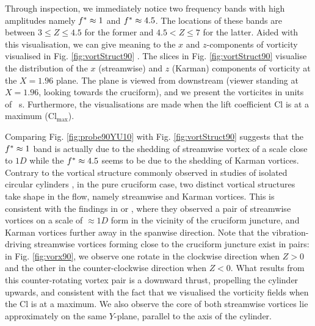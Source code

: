 \documentclass[oneside]{utmthesis}
\begin{document}
Through inspection, we immediately notice two frequency bands with high amplitudes namely $f^{*} \approx 1$ and $f^{*} \approx 4.5$. The locations of these bands are between $3 \leq Z \leq 4.5$ for the former and $4.5 < Z \leq 7$ for the latter. Aided with this visualisation, we can give meaning to the $x$ and $z$-components of vorticity visualised in Fig. \ref{fig:vortStruct90} . The slices in Fig. \ref{fig:vortStruct90} visualise the distribution of the $x$ (streamwise) and $z$ (Karman) components of vorticity at the $X = 1.96$ plane. The plane is viewed from downstream (viewer standing at $X = 1.96$, looking towards the cruciform), and we present the vorticites in units of \si{\per\second}. Furthermore, the visualisations are made when the lift coefficient Cl is at a maximum ($\text{Cl}_{\text{max}}$).

Comparing Fig. \ref{fig:probe90YU10} with Fig. \ref{fig:vortStruct90} suggests that the $f^{*} \approx 1$ band is actually due to the shedding of streamwise vortex of a scale close to $1D$ while the $f^{*} \approx 4.5$ seems to be due to the shedding of Karman vortices. Contrary to the vortical structure commonly observed in studies of isolated circular cylinders \citep{Deng2007,Kinaci2016,Duranay2020}, in the pure cruciform case, two distinct vortical structures take shape in the flow, namely streamwise and Karman vortices. This is consistent with the findings in \citet{Koide2017} or \citet{Zhao2018a}, where they observed a pair of streamwise vortices on a scale of $\approx 1D$ form in the vicinity of the cruciform juncture, and Karman vortices further away in the spanwise direction. Note that the vibration-driving streamwise vortices forming close to the cruciform juncture exist in pairs: in Fig. \ref{fig:vorx90}, we observe one rotate in the clockwise direction when $Z > 0$ and the other in the counter-clockwise direction when $Z < 0$. What results from this counter-rotating vortex pair is a downward thrust, propelling the cylinder upwards, and consistent with the fact that we visualised the vorticity fields when the Cl is at a maximum. We also observe the core of both streamwise vortices lie approximately on the same $Y$-plane, parallel to the axis of the cylinder.
\end{document}
